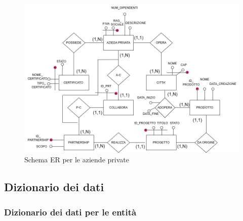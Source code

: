 \documentclass{article}
\begin{document}
    \begin{figure}[H]
        
        \hspace{2cm}
        \includegraphics[width=13.7cm]{images/AZIENDA_PRIVATA_COMPLETO.drawio.png}
        \caption{Schema ER per le aziende private}
        \label{fig:schema-sostenibilita5}
    \end{figure}


\newpage
\subsection{Dizionario dei dati}
 \subsubsection{Dizionario dei dati per le entità}
\end{document}
